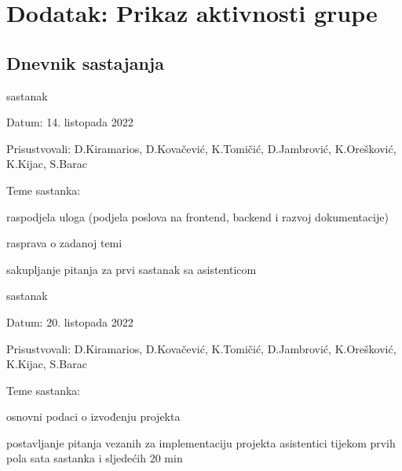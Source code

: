 \chapter*{Dodatak: Prikaz aktivnosti grupe}
		
		\section*{Dnevnik sastajanja}
		
		
		
		\begin{packed_enum}
			\item  sastanak
			
			\item[] \begin{packed_item}
				\item Datum: 14. listopada 2022
				\item Prisustvovali: D.Kiramarios, D.Kovačević, K.Tomičić, D.Jambrović, K.Orešković, K.Kijac, S.Barac
				\item Teme sastanka:
				\begin{packed_item}
					\item  raspodjela uloga (podjela poslova na frontend, backend i razvoj dokumentacije)
					\item  rasprava o zadanoj temi
					\item  sakupljanje pitanja za prvi sastanak sa asistenticom
				\end{packed_item}
			\end{packed_item}
			
			\item  sastanak
			\item[] \begin{packed_item}
				\item Datum: 20. listopada 2022
				\item Prisustvovali: D.Kiramarios, D.Kovačević, K.Tomičić, D.Jambrović, K.Orešković, K.Kijac, S.Barac
				\item Teme sastanka:
				\begin{packed_item}
					\item  osnovni podaci o izvođenju projekta
					\item  postavljanje pitanja vezanih za implementaciju projekta asistentici tijekom prvih pola sata sastanka i sljedećih 20 min
				\end{packed_item}
			\end{packed_item}


\end{packed_enum}
